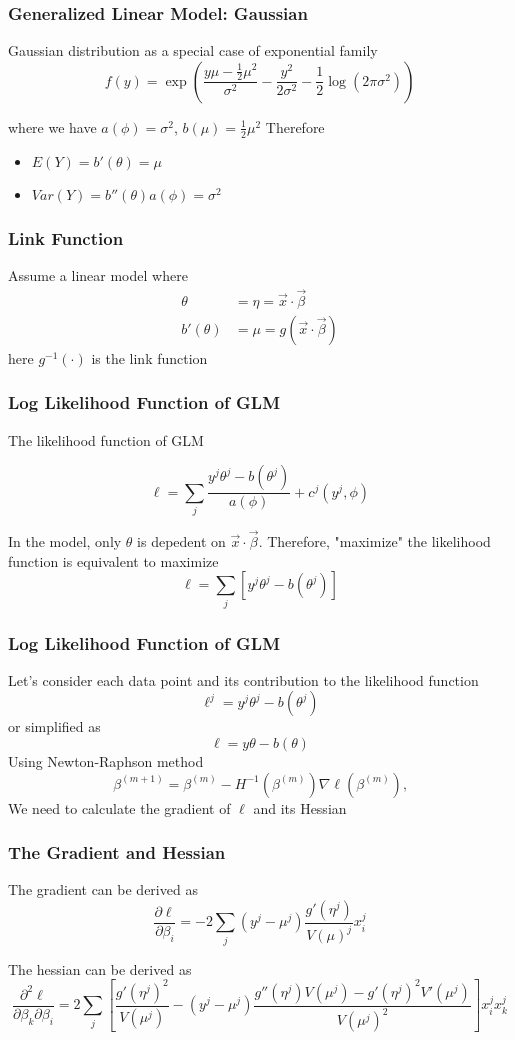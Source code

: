 \documentclass[notheorems, aspectratio=54]{beamer}
\begin{document}
\begin{frame}

\frametitle{Generalized Linear Model: Gaussian}
Gaussian distribution as a special case of exponential family 
$$
f(y)=\exp\left( \frac{y\mu-\frac{1}{2}\mu^2}{\sigma^2}-\frac{y^2}{2\sigma^2}-\frac{1}{2}\log(2\pi\sigma^2)\right)
$$

where we have $a(\phi)=\sigma^2$, $b(\mu)=\frac{1}{2}\mu^2$
Therefore
\begin{itemize}
\item $E(Y)=b'(\theta)=\mu$
\item $Var(Y)=b''(\theta)a(\phi)=\sigma^2$
\end{itemize}
\end{frame}

\begin{frame}
\frametitle{Link Function}
Assume a linear model where 
\begin{align*}
\theta&=\eta=\vec{x}\cdot\vec{\beta}\\
b'(\theta)&=\mu=g(\vec{x}\cdot\vec{\beta})
\end{align*}
here $g^{-1}(\cdot)$ is the link function

\end{frame}

\begin{frame}
\frametitle{Log Likelihood Function of GLM}
The likelihood function of GLM

$$\ell=\sum_{j}\frac{y^j\theta^j-b(\theta^j)}{a(\phi)}+c^j(y^j, \phi)$$

In the model, only $\theta$ is depedent on $\vec{x}\cdot\vec{\beta}$. Therefore, "maximize" the likelihood function is equivalent to maximize 
$$\ell=\sum_{j} \left[y^j\theta^j-b(\theta^j)\right]$$

\end{frame}

\begin{frame}
\frametitle{Log Likelihood Function of GLM}

Let's consider each data point and its contribution to the likelihood function
$$\ell^j=y^j\theta^j-b(\theta^j)$$ or simplified as $$\ell=y\theta-b(\theta)$$
Using Newton-Raphson method
$$
\beta^{(m+1)}=\beta^{(m)}-H^{-1}(\beta^{(m)})\nabla \ell(\beta^{(m)})\text{,}
$$
We need to calculate the gradient of $\ell$ and its Hessian
\end{frame}

\begin{frame}
\frametitle{The Gradient and Hessian}
The gradient can be derived as
$$\frac{\partial \ell}{\partial \beta_i}=-2\sum_j(y^j-\mu^j)\frac{g'(\eta^j)}{V(\mu)^j}x_i^j$$

The hessian can be derived as
$$\frac{\partial^2 \ell}{\partial \beta_k\partial \beta_i}=2\sum_j\left[\frac{g'(\eta^j)^2}{V(\mu^j)}-(y^j-\mu^j)\frac{g''(\eta^j)V(\mu^j)-g'(\eta^j)^2V'(\mu^j)}{V(\mu^j)^2}\right]x_i^jx_k^j$$
\end{frame}
\end{document}
